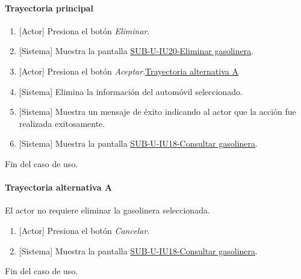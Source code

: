 \paragraph{Trayectoria principal}
	\begin{enumerate}
		\item {[Actor]} Presiona el botón \textit{Eliminar}.
		\item {[Sistema]} Muestra la pantalla \hyperref[fig:sub-u-iu20]{SUB-U-IU20-Eliminar gasolinera}.
		\item {[Actor]} Presiona el botón \textit{Aceptar}.\hyperref[SUB-U-CU20:TA]{Trayectoria alternativa A}
		\item {[Sistema]} Elimina la información del automóvil seleccionado.
		\item {[Sistema]} Muestra un mensaje de éxito indicando al actor que la acción fue realizada exitosamente.
		\item \label{SUB-U-CU20:Pantalla} {[Sistema]} Muestra la pantalla \hyperref[fig:sub-u-iu18]{SUB-U-IU18-Consultar gasolinera}.
	\end{enumerate}
	Fin del caso de uso.

\paragraph{Trayectoria alternativa A} \label{SUB-U-CU20:TA}
	El actor no requiere eliminar la gasolinera seleccionada.
	\begin{enumerate}[label=A\arabic*.]
		\item {[Actor]} Presiona el botón \textit{Cancelar}.
		\item {[Sistema]} Muestra la pantalla \hyperref[fig:sub-u-iu18]{SUB-U-IU18-Consultar gasolinera}.
	\end{enumerate}
	Fin del caso de uso.

